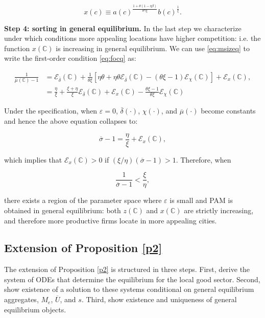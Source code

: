 \begin{equation*}\label{eq:singleindex}
	x(c) \equiv  a(c)^{\frac{1+\theta(1-\eta \beta)}{\theta \gamma \xi}} b(c)^\frac{1}{\xi}.
\end{equation*}

\noindent \textbf{Step 4: sorting in general equilibrium.} In the last step we characterize under which conditions
more appealing locations have higher competition: i.e. the function $x(\mathbb{C})$ is increasing in
general equilibrium. We can use \eqref{eq:msizeq} to write the first-order condition \eqref{eq:focq} as:

\begin{align*}
	\frac{1}{\overline{\mu}({\mathbb{C}}) - 1}  & = \mathcal{E}_{\overline{\delta}}({\mathbb{C}}) +  \frac{1}{\theta\xi}\left[\eta \theta + \eta \theta \mathcal{E}_{\overline{\delta}}({\mathbb{C}})  - (\theta\xi - 1)\mathcal{E}_{\chi}({\mathbb{C}})  \right] + \mathcal{E}_{x}({\mathbb{C}}), \\
	& = \frac{\eta}{\xi} + \frac{\xi + \eta}{\xi}\mathcal{E}_{\overline{\delta}}({\mathbb{C}}) + \mathcal{E}_{x}({\mathbb{C}}) - \frac{\theta\xi - 1}{\theta\xi} \mathcal{E}_{\chi}({\mathbb{C}})
\end{align*}

Under the \textcite{Klenow&Willis16} specification, when $\varepsilon = 0$, $\overline{\delta}(\cdot)$, $\chi(\cdot)$, and $\overline{\mu}(\cdot)$ become constants and hence the above equation collapses to:

\begin{equation*}
	\overline{\sigma} - 1 = \frac{\eta}{\xi} + \mathcal{E}_{x}({\mathbb{C}}),
\end{equation*}

which implies that $\mathcal{E}_{x}({\mathbb{C}}) > 0 $ if $\left(\xi/ \eta \right) \left(\overline{\sigma} - 1\right) > 1$. Therefore, when

\begin{equation*}
	\frac{1}{\overline{\sigma} - 1} < \frac{\xi}{\eta},
\end{equation*}

there exists a region of the parameter space where $\varepsilon$ is small and PAM is obtained in general equilibrium: both $z(\mathbb{C})$ and $x(\mathbb{C})$ are strictly increasing, and therefore more productive firms locate in more appealing cities.

\subsection{Extension of Proposition \ref{p2}}
The extension of Proposition \ref{p2} is structured in three steps. First, derive the system of ODEs that determine the equilibrium for the local good sector. Second, show existence of a solution to these systems conditional on general equilibrium aggregates, $M_e$, $\overline{U}$, and $s$. Third, show existence and uniqueness of general equilibrium objects.


